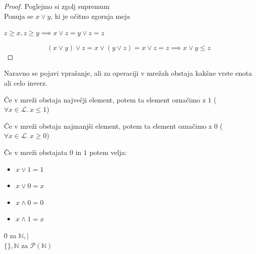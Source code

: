 \documentclass[slovene]{beamer}
\begin{document}
\begin{frame}
\begin{proof}
\centering
Poglejmo si zgolj supremum\\ \pause
Ponuja se $x \lor y$, ki je očitno zgornja meja
\begin{center}
$z \geq x, z \geq y \implies x \lor z = y \lor z = z$ \pause
\end{center} 
$$(x \lor y) \lor z = x \lor (y \lor z) = x \lor z = z \implies x \lor y \leq z$$
\end{proof}


\end{frame}

\begin{frame}

\begin{block}{}
Naravno se pojavi vprašanje, ali za operaciji v mrežah obstaja kakšne vrste enota ali celo inverz.
\end{block}

\begin{definition}
Če v mreži obstaja največji element, potem ta element označimo z $1$ ($\forall x \in \mathcal{L}. \ x \leq 1$)
\end{definition}

\begin{definition}
Če v mreži obstaja najmanjši element, potem ta element označimo z $0$ ($\forall x \in \mathcal{L}. \ x \geq 0$)
\end{definition}

\end{frame}

\begin{frame}
\begin{block}{}
Če v mreži obstajata $0$ in $1$ potem velja:
\begin{itemize}
\item $x \lor 1 = 1$
\item $x \lor 0 = x$
\item $x \land 0 = 0$
\item $x \land 1 = x$
\end{itemize}
\end{block}

\pause
\begin{example}
$0$ za $\mathbb{N}, |$\\ $\{ \}, \mathbb{N}$ za $\mathcal{P}(\mathbb{N})$
\end{example}

\end{frame}
\end{document}
